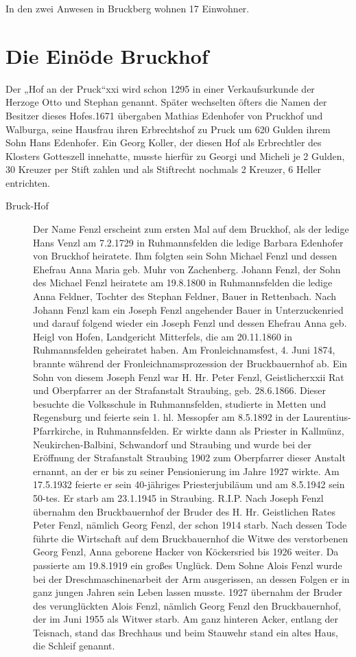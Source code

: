 \documentclass[12pt,a4pager,draft]{book}
\begin{document}
In den zwei Anwesen in Bruckberg wohnen 17 Einwohner.

\section{Die Einöde Bruckhof}

Der „Hof an der Pruck“xxi wird schon 1295 in einer Verkaufsurkunde der Herzoge
Otto und Stephan genannt. Später wechselten öfters die Namen der Besitzer dieses
Hofes.1671 übergaben Mathias Edenhofer von Pruckhof und Walburga, seine Hausfrau
ihren Erbrechtshof zu Pruck um 620 Gulden ihrem Sohn Hans Edenhofer. Ein Georg
Koller, der diesen Hof als Erbrechtler des Klosters Gotteszell innehatte, musste
hierfür zu Georgi und Micheli je 2 Gulden, 30 Kreuzer per Stift zahlen und als
Stiftrecht nochmals 2 Kreuzer, 6 Heller entrichten.

\begin{description}
\item[Bruck-Hof] Der Name Fenzl erscheint zum ersten Mal auf dem Bruckhof, als
der ledige Hans Venzl am 7.2.1729 in Ruhmannsfelden die ledige Barbara Edenhofer
von Bruckhof heiratete. Ihm folgten sein Sohn Michael Fenzl und dessen Ehefrau
Anna Maria geb. Muhr von Zachenberg. Johann Fenzl, der Sohn des Michael Fenzl
heiratete am 19.8.1800 in Ruhmannsfelden die ledige Anna Feldner, Tochter des
Stephan Feldner, Bauer in Rettenbach. Nach Johann Fenzl kam ein Joseph Fenzl
angehender Bauer in Unterzuckenried und darauf folgend wieder ein Joseph Fenzl
und dessen Ehefrau Anna geb. Heigl von Hofen, Landgericht Mitterfels, die am
20.11.1860 in Ruhmannsfelden geheiratet haben. Am Fronleichnamsfest, 4. Juni
1874, brannte während der Fronleichnamsprozession der Bruckbauernhof ab. Ein
Sohn von diesem Joseph Fenzl war H. Hr. Peter Fenzl, Geistlicherxxii Rat und
Oberpfarrer an der Strafanstalt Straubing, geb. 28.6.1866. Dieser besuchte die
Volksschule in Ruhmannsfelden, studierte in Metten und Regensburg und feierte
sein 1. hl. Messopfer am 8.5.1892 in der Laurentius-Pfarrkirche, in
Ruhmannsfelden. Er wirkte dann als Priester in Kallmünz, Neukirchen-Balbini,
Schwandorf und Straubing und wurde bei der Eröffnung der Strafanstalt Straubing
1902 zum Oberpfarrer dieser Anstalt ernannt, an der er bis zu seiner
Pensionierung im Jahre 1927 wirkte. Am 17.5.1932 feierte er sein 40-jähriges
Priesterjubiläum und am 8.5.1942 sein 50-tes. Er starb am 23.1.1945 in
Straubing. R.I.P. Nach Joseph Fenzl übernahm den Bruckbauernhof der Bruder des
H. Hr. Geistlichen Rates Peter Fenzl, nämlich Georg Fenzl, der schon 1914 starb.
Nach dessen Tode führte die Wirtschaft auf dem Bruckbauernhof die Witwe des
verstorbenen Georg Fenzl, Anna geborene Hacker von Köckersried bis 1926 weiter.
Da passierte am 19.8.1919 ein großes Unglück. Dem Sohne Alois Fenzl wurde bei
der Dreschmaschinenarbeit der Arm ausgerissen, an dessen Folgen er in ganz
jungen Jahren sein Leben lassen musste. 1927 übernahm der Bruder des
verunglückten Alois Fenzl, nämlich Georg Fenzl den Bruckbauernhof, der im Juni
1955 als Witwer starb. Am ganz hinteren Acker, entlang der Teisnach, stand das
Brechhaus und beim Stauwehr stand ein altes Haus, die Schleif genannt.
\end{description}
\end{document}
